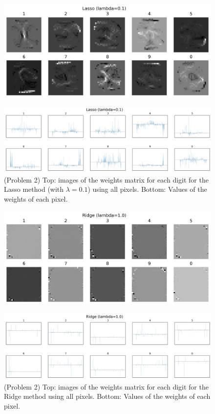 \documentclass[10pt]{article}
\begin{document}
\begin{figure}[ht]
\centerline{\includegraphics[scale=0.8]{figures/weight_matrix_lasso_01.png}}
\label{fig7a}
\end{figure}

\begin{figure}[ht]
\centerline{\includegraphics[scale=0.5]{figures/bar_plot_loadings_lasso_01.png}}
\caption{(Problem 2) Top: images of the weights matrix for each digit for the Lasso method (with $\lambda=0.1$) using all pixels. Bottom: Values of the weights of each pixel.}
\label{fig7b}
\end{figure}

\begin{figure}[ht]
\centerline{\includegraphics[scale=0.8]{figures/weight_matrix_ridge.png}}
\label{fig8a}
\end{figure}

\begin{figure}[ht]
\centerline{\includegraphics[scale=0.5]{figures/bar_plot_loadings_ridge.png}}
\caption{(Problem 2) Top: images of the weights matrix for each digit for the Ridge method using all pixels. Bottom: Values of the weights of each pixel.}
\label{fig8b}
\end{figure}
\end{document}
